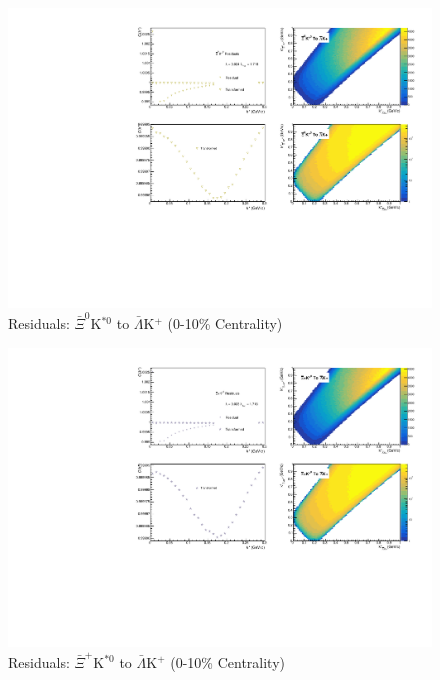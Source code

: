 \documentclass[../AnalysisNoteJBuxton.tex]{subfiles}
\begin{document}
\begin{figure}[h]
  \centering
  \includegraphics[width=\textwidth]{9_AdditionalFigures/Figures/Residuals/ALamKchP/Residuals_ALamKchP_0010_AXi0KSt0_MomResCrctn_NonFlatBgdCrctn_10Res_PrimMaxDecay4fm_UsingXiDataAndCoulombOnly.pdf}
  \caption[Residuals: $\bar{\Xi}^{0}$K$^{*0}$ to $\bar{\Lambda}$K$^{+}$ (0-10\% Centrality)]{Residuals: $\bar{\Xi}^{0}$K$^{*0}$ to $\bar{\Lambda}$K$^{+}$ (0-10\% Centrality)}
  \label{fig:Res_ALamKchP_0010_AXi0KSt0}
\end{figure}

\begin{figure}[h]
  \centering
  \includegraphics[width=\textwidth]{9_AdditionalFigures/Figures/Residuals/ALamKchP/Residuals_ALamKchP_0010_AXiKSt0_MomResCrctn_NonFlatBgdCrctn_10Res_PrimMaxDecay4fm_UsingXiDataAndCoulombOnly.pdf}
  \caption[Residuals: $\bar{\Xi}^{+}$K$^{*0}$ to $\bar{\Lambda}$K$^{+}$ (0-10\% Centrality)]{Residuals: $\bar{\Xi}^{+}$K$^{*0}$ to $\bar{\Lambda}$K$^{+}$ (0-10\% Centrality)}
  \label{fig:Res_ALamKchP_0010_AXiCKSt0}
\end{figure}
\end{document}
